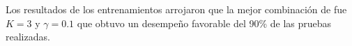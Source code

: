 %
%
%
%
%
%

Los resultados de los entrenamientos arrojaron que la mejor combinaci\'on de fue $K = 3$ y $ \gamma = 0.1 $ que obtuvo un desempeño favorable del 90\% de las pruebas realizadas.

